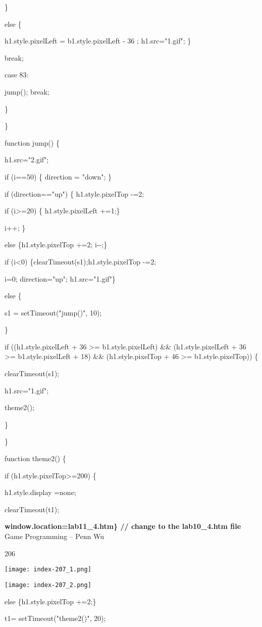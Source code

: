 \documentclass[
]{article}
\begin{document}
\}

else \{

h1.style.pixelLeft = b1.style.pixelLeft - 36 ; h1.src="1.gif"; \}

break;

case 83:

jump(); break;

\}

\}

function jump() \{

h1.src="2.gif";

if (i==50) \{ direction = "down"; \}

if (direction=="up") \{ h1.style.pixelTop -=2;

if (i\textgreater=20) \{ h1.style.pixelLeft +=1;\}

i++; \}

else \{h1.style.pixelTop +=2; i-\/-;\}

if (i\textless0) \{clearTimeout(s1);h1.style.pixelTop -=2;

i=0; direction="up"; h1.src="1.gif"\}

else \{

s1 = setTimeout("jump()", 10);

\}

if ((h1.style.pixelLeft + 36 \textgreater= b1.style.pixelLeft) \&\&
(h1.style.pixelLeft + 36 \textgreater= b1.style.pixelLeft + 18) \&\&
(h1.style.pixelTop + 46 \textgreater= b1.style.pixelTop)) \{

clearTimeout(s1);

h1.src="1.gif";

theme2();

\}

\}

function theme2() \{

if (h1.style.pixelTop\textgreater=200) \{

h1.style.display =\textquotesingle none\textquotesingle;

clearTimeout(t1);

\textbf{window.location=\textquotesingle lab11\_4.htm\textquotesingle\}
// change to the lab10\_4.htm file} Game Programming -- Penn Wu

206

\protect\hypertarget{index_split_011.htmlux5cux23p207}{}{}\texttt{[image: index-207\_1.png]}

\texttt{[image: index-207\_2.png]}

else \{h1.style.pixelTop +=2;\}

t1= setTimeout("theme2()", 20);
\end{document}
